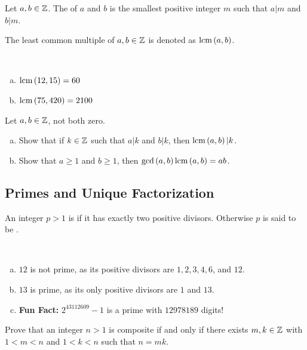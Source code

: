 \documentclass[11pt,fleqn,dvipsnames,usenames]{article}
\begin{document}
\begin{definition}
Let $a,b\in\mathbb{Z}$.  The  of $a$ and $b$ is the smallest positive integer $m$ such that $a|m$ and $b|m$.
\end{definition}
\vsmsp

\notation The least common multiple of $a,b\in\mathbb{Z}$ is denoted as $\text{lcm}\left(a,b\right)$.
\vsp

\begin{examples}~
\begin{enumerate}[(a)]
\item $\text{lcm}\left(12, 15\right) = 60$
\item $\text{lcm}\left(75, 420\right) = 2100$ 
\end{enumerate}
\end{examples}
\vsp

\exercises Let $a,b\in\mathbb{Z}$, not both zero.
\begin{enumerate}[(a)]
\item Show that if $k\in\mathbb{Z}$ such that $a|k$ and $b|k$, then $\text{lcm}\left(a, b\right)|k$.
\item Show that $a\geq 1$ and $b\geq 1$, then $\text{gcd}\left(a, b\right)\text{lcm}\left(a, b\right) = ab$.
\end{enumerate}
\vsp

\subsection{Primes and Unique Factorization}

\begin{definition}
An integer $p > 1$ is  if it has exactly two positive divisors.  Otherwise $p$ is said to be .
\end{definition}
\vsmsp

\begin{examples}~
\begin{enumerate}[(a)]
\item $12$ is not prime, as its positive divisors are $1, 2, 3, 4, 6$, and $12$.
\item $13$ is prime, as its only positive divisors are $1$ and $13$.
\item \textbf{Fun Fact:} $2^{43112609} - 1$ is a prime with $12978189$ digits!
\end{enumerate}
\end{examples}
\vsp

\begin{exercise}
Prove that an integer $n>1$ is composite if and only if there exists $m,k\in\mathbb{Z}$ with $1 < m < n$ and $1 < k < n$ such that $n = mk$.
\end{exercise}
\vsp
\end{document}
